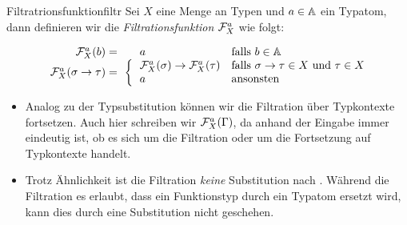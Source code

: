 \begin{definition}{Filtratrionsfunktion}{filtr}
    Sei $X$ eine Menge an Typen und $a\in\mathbb{A}$ ein Typatom, dann definieren wir die \emph{Filtrationsfunktion} $\mathcal{F}^a_X$ wie folgt:
    
     \[\begin{array}{rcll}
             \F^a_X(b) =& &a& \text{falls }b\in\At\\
             \multirow{2}{*}{$\F^a_X(\sigma\to\tau)=$} & \hspace{-0.3cm}
             \multirow{2}{*}{$\left\{
             \begin{array}{l}
             \\
             \\
             \end{array}\right.$}\hspace{-0.7cm}
             & \F^a_X(\sigma) \to \F^a_X(\tau) & \text{falls }\sigma\to\tau\in X\text{ und }\tau\in X\\
             & & a & \text{ansonsten}
    \end{array}\]
\end{definition}
    \begin{remark}
        \begin{itemize}
        \item Analog zu der Typsubstitution können wir die Filtration über Typkontexte fortsetzen. Auch hier schreiben wir $\mathcal{F}^a_X(\Gamma)$, da anhand der Eingabe immer eindeutig ist, ob es sich um die Filtration oder um die Fortsetzung auf Typkontexte handelt.
        \item Trotz Ähnlichkeit ist die Filtration \emph{keine} Substitution nach . Während die Filtration es erlaubt, dass ein Funktionstyp durch ein Typatom ersetzt wird, kann dies durch eine Substitution nicht geschehen.
        \end{itemize}
    \end{remark}

